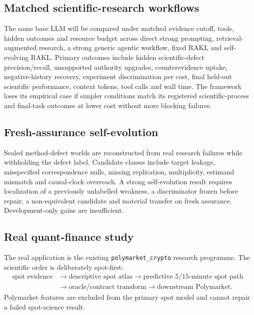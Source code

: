 \documentclass[11pt]{article}
\newcommand{\RAKL}{\textsc{RAKL}}
\begin{document}
\subsection{Matched scientific-research workflows}
The same base LLM will be compared under matched evidence cutoff, tools, hidden outcomes and resource budget across direct strong prompting, retrieval-augmented research, a strong generic agentic workflow, fixed \RAKL{} and self-evolving \RAKL{}. Primary outcomes include hidden scientific-defect precision/recall, unsupported authority upgrades, counterevidence uptake, negative-history recovery, experiment discrimination per cost, final held-out scientific performance, context tokens, tool calls and wall time. The framework loses its empirical case if simpler conditions match its registered scientific-process and final-task outcomes at lower cost without more blocking failures.

\subsection{Fresh-assurance self-evolution}
Sealed method-defect worlds are reconstructed from real research failures while withholding the defect label. Candidate classes include target leakage, misspecified correspondence nulls, missing replication, multiplicity, estimand mismatch and causal-clock overreach. A strong self-evolution result requires localization of a previously unlabelled weakness, a discriminator frozen before repair, a non-equivalent candidate and material transfer on fresh assurance. Development-only gains are insufficient.

\subsection{Real quant-finance study}
The real application is the existing \texttt{polymarket\_crypto} research programme. The scientific order is deliberately spot-first:
\begin{equation}
\begin{aligned}
\text{spot evidence}&\to\text{descriptive spot atlas}\to\text{predictive 5/15-minute spot path}\\
&\to\text{oracle/contract transform}\to\text{downstream Polymarket}.
\end{aligned}
\end{equation}
Polymarket features are excluded from the primary spot model and cannot repair a failed spot-science result.
\end{document}
